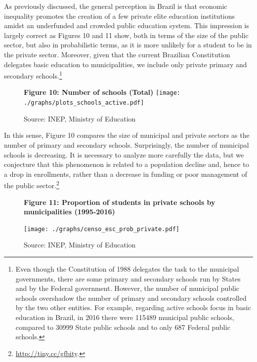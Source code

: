 \documentclass[12pt,]{article}
\let\rmarkdownfootnote\footnote%
\def\footnote{\protect\rmarkdownfootnote}
\begin{document}
As previously discussed, the general perception in Brazil is that
economic inequality promotes the creation of a few private elite
education institutions amidst an underfunded and crowded public
education system. This impression is largely correct as Figures 10 and
11 show, both in terms of the size of the public sector, but also in
probabilistic terms, as it is more unlikely for a student to be in the
private sector. Moreover, given that the current Brazilian Constitution
delegates basic education to municipalities, we include only private
primary and secondary schools.\footnote{Even though the Constitution of
  1988 delegates the task to the municipal governments, there are some
  primary and secondary schools run by States and by the Federal
  government. However, the number of municipal public schools overshadow
  the number of primary and secondary schools controlled by the two
  other entities. For example, regarding active schools focus in basic
  education in Brazil, in 2016 there were 115489 municipal public
  schools, compared to 30999 State public schools and to only 687
  Federal public schools.}

\begin{figure}
    \centering
    \textbf{Figure 10: Number of schools (Total)}
    \texttt{[image: ./graphs/plots\_schools\_active.pdf]}
    \caption*{\footnotesize \hfill Source: INEP, Ministry of Education}
\end{figure}

In this sense, Figure 10 compares the size of municipal and private
sectors as the number of primary and secondary schools. Surprisingly,
the number of municipal schools is decreasing. It is necessary to
analyze more carefully the data, but we conjecture that this phenomenon
is related to a population decline and, hence to a drop in enrollments,
rather than a decrease in funding or poor management of the public
sector.\footnote{\href{https://g1.globo.com/educacao/noticia/cai-numero-de-matriculas-no-ensino-fundamental-e-no-ensino-medio-das-escolas-publicas-diz-censo-escolar.ghtml}{http://tiny.cc/gfbity}.}

\begin{figure}
    \centering
    \textbf{\small Figure 11: Proportion of students in private schools by municipalities (1995-2016)}\par\medskip
    \texttt{[image: ./graphs/censo\_esc\_prob\_private.pdf]}
    \caption*{\footnotesize \hfill Source: INEP, Ministry of Education}
\end{figure}
\end{document}

